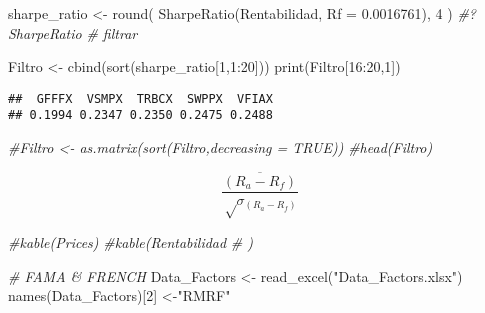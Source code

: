 \documentclass[
]{article}
\newenvironment{Shaded}{\begin{snugshade}}{\end{snugshade}}
\newcommand{\AttributeTok}[1]{\textcolor[rgb]{0.77,0.63,0.00}{#1}}
\newcommand{\CommentTok}[1]{\textcolor[rgb]{0.56,0.35,0.01}{\textit{#1}}}
\newcommand{\ControlFlowTok}[1]{\textcolor[rgb]{0.13,0.29,0.53}{\textbf{#1}}}
\newcommand{\DecValTok}[1]{\textcolor[rgb]{0.00,0.00,0.81}{#1}}
\newcommand{\FloatTok}[1]{\textcolor[rgb]{0.00,0.00,0.81}{#1}}
\newcommand{\FunctionTok}[1]{\textcolor[rgb]{0.00,0.00,0.00}{#1}}
\newcommand{\NormalTok}[1]{#1}
\newcommand{\OtherTok}[1]{\textcolor[rgb]{0.56,0.35,0.01}{#1}}
\newcommand{\SpecialCharTok}[1]{\textcolor[rgb]{0.00,0.00,0.00}{#1}}
\newcommand{\StringTok}[1]{\textcolor[rgb]{0.31,0.60,0.02}{#1}}
\begin{document}
\begin{Shaded}
\begin{Highlighting}[]
\NormalTok{sharpe\_ratio }\OtherTok{\textless{}{-}} \FunctionTok{round}\NormalTok{(}
  \FunctionTok{SharpeRatio}\NormalTok{(Rentabilidad, }\AttributeTok{Rf =} \FloatTok{0.0016761}\NormalTok{), }\DecValTok{4}
\NormalTok{)}
\CommentTok{\#?SharpeRatio}
\CommentTok{\# filtrar}

\NormalTok{Filtro }\OtherTok{\textless{}{-}} \FunctionTok{cbind}\NormalTok{(}\FunctionTok{sort}\NormalTok{(sharpe\_ratio[}\DecValTok{1}\NormalTok{,}\DecValTok{1}\SpecialCharTok{:}\DecValTok{20}\NormalTok{]))}
\FunctionTok{print}\NormalTok{(Filtro[}\DecValTok{16}\SpecialCharTok{:}\DecValTok{20}\NormalTok{,}\DecValTok{1}\NormalTok{])}
\end{Highlighting}
\end{Shaded}

\begin{verbatim}
##  GFFFX  VSMPX  TRBCX  SWPPX  VFIAX 
## 0.1994 0.2347 0.2350 0.2475 0.2488
\end{verbatim}

\begin{Shaded}
\begin{Highlighting}[]
\CommentTok{\#Filtro \textless{}{-} as.matrix(sort(Filtro,decreasing = TRUE))}
\CommentTok{\#head(Filtro)}
\end{Highlighting}
\end{Shaded}

\[
\frac{\overline{(R_{a}-R_{f})}}{√{σ_{(R_{a}-R_{f})}}}
\]

\begin{Shaded}
\begin{Highlighting}[]
\CommentTok{\#kable(Prices)}
\CommentTok{\#kable(Rentabilidad}
\CommentTok{\#      )}
\end{Highlighting}
\end{Shaded}

\begin{Shaded}
\begin{Highlighting}[]
\CommentTok{\# FAMA \& FRENCH}
\NormalTok{Data\_Factors }\OtherTok{\textless{}{-}} \FunctionTok{read\_excel}\NormalTok{(}\StringTok{"Data\_Factors.xlsx"}\NormalTok{)}
\FunctionTok{names}\NormalTok{(Data\_Factors)[}\DecValTok{2}\NormalTok{] }\OtherTok{\textless{}{-}}\StringTok{"RMRF"}
\end{Highlighting}
\end{Shaded}

\begin{Shaded}
\end{Shaded}
\end{document}
